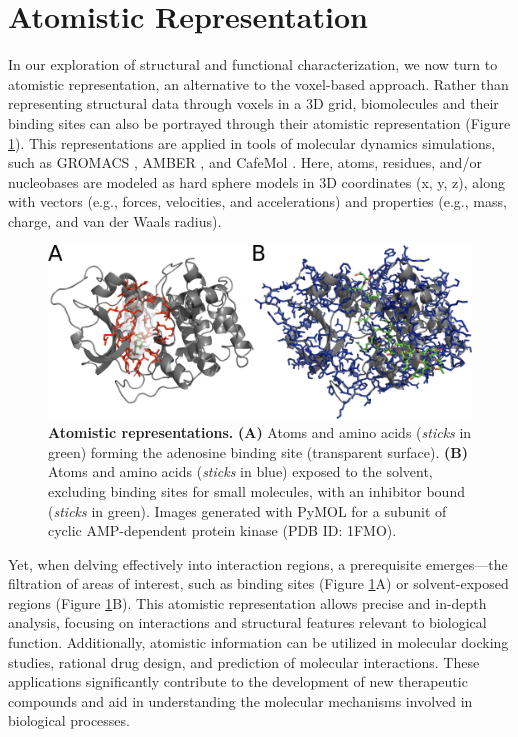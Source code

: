 \documentclass[Ingles]{phdthesis}
\def\eg{e.g.\onedot}
\begin{document}
\section{Atomistic Representation}

In our exploration of structural and functional characterization, we now turn to atomistic representation, an alternative to the voxel-based approach. Rather than representing structural data through voxels in a 3D grid, biomolecules and their binding sites can also be portrayed through their atomistic representation (Figure \ref{fig:atomistic-representation}). This representations are applied in tools of molecular dynamics simulations, such as GROMACS \cite{gromacs}, AMBER \cite{amber}, and CafeMol \cite{kenzaki2011}. Here, atoms, residues, and/or nucleobases are modeled as hard sphere models in 3D coordinates (x, y, z), along with vectors (\eg, forces, velocities, and accelerations) and properties (\eg, mass, charge, and van der Waals radius).

\begin{figure}[h]
  \centerline{\includegraphics[scale=2]{images/atomistic-representation.png}}
  \caption[Atomistic representations]{\textbf{Atomistic representations.} \textbf{(A)} Atoms and amino acids (\textit{sticks} in green) forming the adenosine binding site (transparent surface). \textbf{(B)} Atoms and amino acids (\textit{sticks} in blue) exposed to the solvent, excluding binding sites for small molecules, with an inhibitor bound (\textit{sticks} in green). Images generated with PyMOL for a subunit of cyclic AMP-dependent protein kinase (PDB ID: 1FMO).}
  \label{fig:atomistic-representation}
\end{figure}

Yet, when delving effectively into interaction regions, a prerequisite emerges---the filtration of areas of interest, such as binding sites (Figure \ref{fig:atomistic-representation}A) or solvent-exposed regions (Figure \ref{fig:atomistic-representation}B). This atomistic representation allows precise and in-depth analysis, focusing on interactions and structural features relevant to biological function. Additionally, atomistic information can be utilized in molecular docking studies, rational drug design, and prediction of molecular interactions. These applications significantly contribute to the development of new therapeutic compounds and aid in understanding the molecular mechanisms involved in biological processes.
\end{document}
